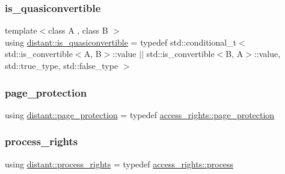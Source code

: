 \mbox{\label{namespacedistant_a5aaf0aee23e381d421c833f927f4ff34}} 
\subsubsection{\texorpdfstring{is\+\_\+quasiconvertible}{is\_quasiconvertible}}
{\footnotesize\ttfamily template$<$class A , class B $>$ \\
using \mbox{\hyperlink{namespacedistant_a5aaf0aee23e381d421c833f927f4ff34}{distant\+::is\+\_\+quasiconvertible}} = typedef std\+::conditional\+\_\+t$<$ std\+::is\+\_\+convertible$<$A, B$>$\+::value $\vert$$\vert$ std\+::is\+\_\+convertible$<$B, A$>$\+::value, std\+::true\+\_\+type, std\+::false\+\_\+type $>$}

\mbox{\label{namespacedistant_a05f6dcaa035f968ca53579be93fe1157}} 
\subsubsection{\texorpdfstring{page\+\_\+protection}{page\_protection}}
{\footnotesize\ttfamily using \mbox{\hyperlink{structdistant_1_1access__rights_a09c6caea8f570f8e2d18c3ef2e2a7804}{distant\+::page\+\_\+protection}} = typedef \mbox{\hyperlink{structdistant_1_1access__rights_a09c6caea8f570f8e2d18c3ef2e2a7804}{access\+\_\+rights\+::page\+\_\+protection}}}

\mbox{\label{namespacedistant_ad7e4772f7cb4a98274a1db27d150bb3f}} 
\subsubsection{\texorpdfstring{process\+\_\+rights}{process\_rights}}
{\footnotesize\ttfamily using \mbox{\hyperlink{structdistant_1_1access__rights_ae153052a690584111c46ec7a78d1ef81}{distant\+::process\+\_\+rights}} = typedef \mbox{\hyperlink{structdistant_1_1access__rights_ae153052a690584111c46ec7a78d1ef81}{access\+\_\+rights\+::process}}}

